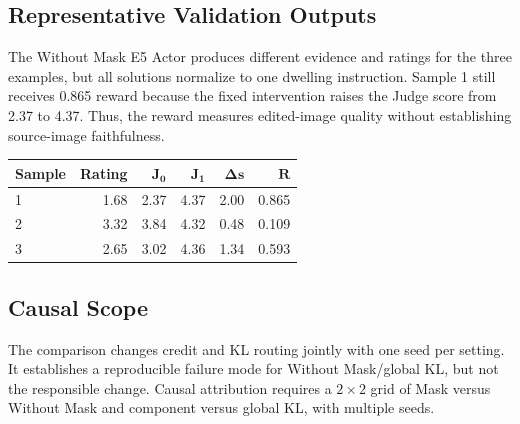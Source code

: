 \subsection{Representative Validation Outputs}
The Without Mask E5 Actor produces different evidence and ratings for the
three examples, but all solutions normalize to one dwelling instruction.
Sample 1 still receives 0.865 reward because the fixed intervention raises the
Judge score from 2.37 to 4.37. Thus, the reward measures edited-image quality
without establishing source-image faithfulness.

\begin{center}
\begin{minipage}{\columnwidth}
\centering
{\small
\setlength{\tabcolsep}{5pt}
\begin{tabular}{@{}lrrrrr@{}}
\toprule
\textbf{Sample} & \textbf{Rating} & $\boldsymbol{J_0}$
& $\boldsymbol{J_1}$ & $\boldsymbol{\Delta s}$ & $\boldsymbol{R}$ \\
\midrule
1 & 1.68 & 2.37 & 4.37 & 2.00 & 0.865 \\
2 & 3.32 & 3.84 & 4.32 & 0.48 & 0.109 \\
3 & 2.65 & 3.02 & 4.36 & 1.34 & 0.593 \\
\bottomrule
\end{tabular}
}
\label{tab:completion-audit-examples}
\end{minipage}
\end{center}

\subsection{Causal Scope}
The comparison changes credit and KL routing jointly with one seed per setting.
It establishes a reproducible failure mode for Without Mask/global KL, but not
the responsible change. Causal attribution requires a $2{\times}2$ grid of
Mask versus Without Mask and component versus global KL, with multiple seeds.

\FloatBarrier

